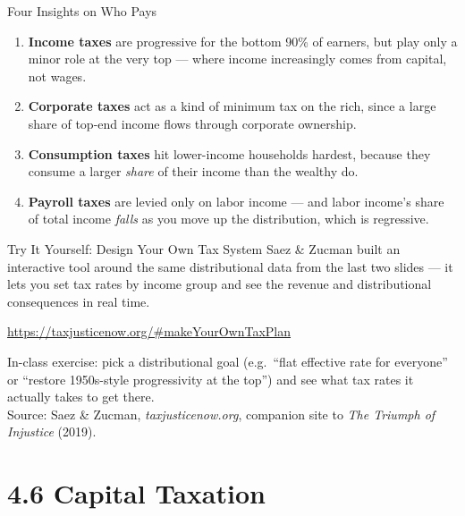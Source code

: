 \documentclass[11pt,aspectratio=169]{beamer}
\newcommand{\srcnote}[1]{{\footnotesize\color{wugray}Source: #1}}
\begin{document}
\begin{frame}{Four Insights on Who Pays}

  \begin{enumerate}
    \setlength{\itemsep}{1pt}
    \item \textbf{Income taxes} are progressive for the bottom 90\% of earners, but play only a minor role at the very top --- where income increasingly comes from capital, not wages.
    \item \textbf{Corporate taxes} act as a kind of minimum tax on the rich, since a large share of top-end income flows through corporate ownership.
    \item \textbf{Consumption taxes} hit lower-income households hardest, because they consume a larger \emph{share} of their income than the wealthy do.
    \item \textbf{Payroll taxes} are levied only on labor income --- and labor income's share of total income \emph{falls} as you move up the distribution, which is regressive.
  \end{enumerate}

\end{frame}

\begin{frame}[fragile]{Try It Yourself: Design Your Own Tax System}
  \small
  Saez \& Zucman built an interactive tool around the same distributional data from the last two slides --- it lets you set tax rates by income group and see the revenue and distributional consequences in real time.
  \vspace{0.5em}
  \begin{center}
    \Large \url{https://taxjusticenow.org/#makeYourOwnTaxPlan}
  \end{center}
  \vspace{0.5em}
  \centering
  \alert{In-class exercise:} pick a distributional goal (e.g.\ ``flat effective rate for everyone'' or ``restore 1950s-style progressivity at the top'') and see what tax rates it actually takes to get there.\\
  \srcnote{Saez \& Zucman, \emph{taxjusticenow.org}, companion site to \emph{The Triumph of Injustice} (2019).}
\end{frame}

\section{4.6 Capital Taxation}
\end{document}
